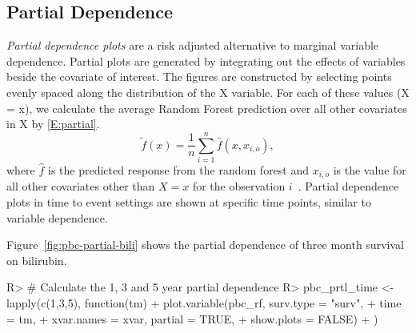 \documentclass[nojss]{jss}\usepackage[]{graphicx}\usepackage[]{color}
\begin{document}
\subsection{Partial Dependence}\label{S:partialDependence}

\emph{Partial dependence plots} are a risk adjusted alternative to marginal variable dependence. Partial plots are generated by integrating out the effects of variables beside the covariate of interest. The figures are constructed by selecting points evenly spaced along the distribution of the X variable. For each of these values (X = x), we calculate the average Random Forest prediction over all other covariates in X by \eqref{E:partial}.
\begin{equation}
\tilde{f}(x) = \frac{1}{n} \sum_{i = 1}^n \hat{f}(x, x_{i, o}), 
\label{E:partial}
\end{equation}
where $\hat{f}$ is the predicted response from the random forest and $x_{i, o}$ is the value for all other covariates other than $X = x$ for the observation $i$~\citep{FriedmanGreedyfunction:2000}. Partial dependence plots in time to event settings are shown at specific time points, similar to variable dependence.

Figure~\ref{fig:pbc-partial-bili} shows the partial dependence of three month survival on bilirubin. 

\begin{Schunk}
\begin{Sinput}
R> # Calculate the 1, 3 and 5 year partial dependence
R> pbc_prtl_time <- lapply(c(1,3,5), function(tm){
+   plot.variable(pbc_rf, surv.type = "surv", 
+                           time = tm, 
+                           xvar.names = xvar, partial = TRUE, 
+                           show.plots = FALSE)
+ })
\end{Sinput}
\end{Schunk}
\end{document}
